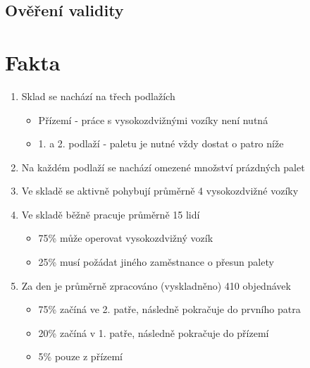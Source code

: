 \documentclass[11pt]{article}
\begin{document}
	\subsection{Ověření validity}

	\newpage
	\section{Fakta}

	\begin{enumerate}
		\item Sklad se nachází na třech podlažích \footnotemark[1]
		\begin{itemize}
			\item \textsf{Přízemí} - práce s vysokozdvižnými vozíky není nutná
			\item \textsf{1. a 2. podlaží} - paletu je nutné vždy dostat o patro níže
		\end{itemize}
		\item Na každém podlaží se nachází omezené množství prázdných palet \footnotemark[1]
		\item Ve skladě se aktivně pohybují průměrně 4 vysokozdvižné vozíky \footnotemark[2]
		\item Ve skladě běžně pracuje průměrně 15 lidí \footnotemark[2]
		\begin{itemize}
			\item \textsf{75\%} může operovat vysokozdvižný vozík
			\item \textsf{25\%} musí požádat jiného zaměstnance o přesun palety
		\end{itemize}
		\item Za den je průměrně zpracováno (vyskladněno) 410 objednávek \footnotemark[2]
		\begin{itemize}
			\item \textsf{75\%} začíná ve 2. patře, následně pokračuje do prvního patra
			\item \textsf{20\%} začíná v 1. patře, následně pokračuje do přízemí
			\item \textsf{5\%} pouze z přízemí
		\end{itemize}
	\end{enumerate}
	
\end{document}
